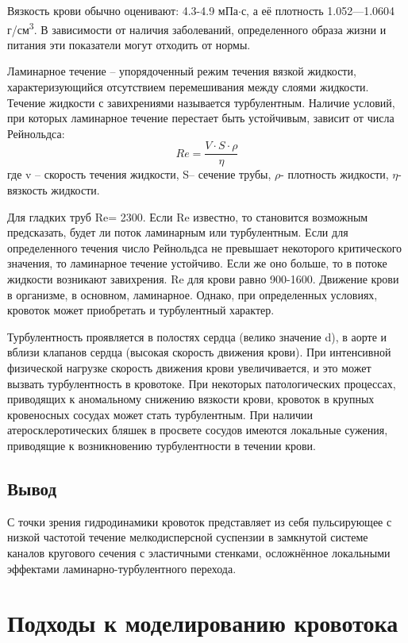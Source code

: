 \documentclass[a4paper, 14pt]{article}
\begin{document}
Вязкость крови обычно оценивают: 4.3-4.9 мПа$\cdot$с, а её плотность 1.052—1.0604 г/см\textsuperscript{3}. В зависимости от наличия заболеваний, определенного образа жизни и питания эти показатели могут отходить от нормы. 

Ламинарное течение – упорядоченный режим течения вязкой жидкости, характеризующийся отсутствием перемешивания между слоями жидкости. Течение жидкости с завихрениями называется турбулентным. 
Наличие условий, при которых ламинарное течение перестает быть устойчивым, зависит от числа Рейнольдса:
$$Re=\frac{V\cdot S\cdot \rho}{\eta}$$
где v – скорость течения жидкости, S– сечение трубы, $\rho$- плотность жидкости, $\eta$- вязкость жидкости.

Для гладких труб Re= 2300. Если Re известно, то становится возможным предсказать, будет ли поток ламинарным или турбулентным. Если для определенного течения число Рейнольдса не превышает некоторого критического значения, то ламинарное течение устойчиво. Если же оно больше, то в потоке жидкости возникают завихрения. Re для крови равно 900-1600. Движение крови в организме, в основном, ламинарное. Однако, при определенных условиях, кровоток может приобретать и турбулентный характер.

Турбулентность проявляется в полостях сердца (велико значение d), в аорте и вблизи клапанов сердца (высокая скорость движения крови). При интенсивной физической нагрузке скорость движения крови увеличивается, и это может вызвать турбулентность в кровотоке. При некоторых патологических процессах, приводящих к аномальному снижению вязкости крови, кровоток в крупных кровеносных сосудах может стать турбулентным.  При наличии атеросклеротических бляшек в просвете сосудов имеются локальные сужения, приводящие к возникновению турбулентности в течении крови. 

\subsection{Вывод}
 С точки зрения гидродинамики кровоток представляет из себя пульсирующее с низкой частотой течение мелкодисперсной суспензии в замкнутой системе каналов кругового сечения с эластичными стенками, осложнённое локальными эффектами ламинарно-турбулентного перехода.

\section{Подходы к моделированию кровотока}
\end{document}
